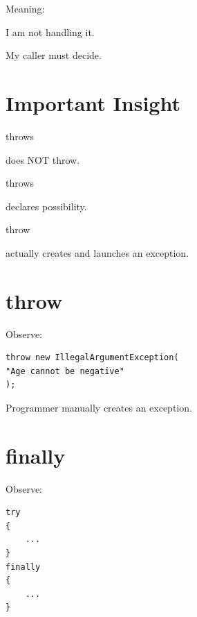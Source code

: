 \documentclass[11pt,a4paper]{book}
\begin{document}

Meaning:


I am not handling it.


My caller must decide.


\section{Important Insight}

throws

does NOT throw.


throws

declares possibility.


throw

actually creates and launches
an exception.


\section{throw}

Observe:

\begin{verbatim} 
throw new IllegalArgumentException(
"Age cannot be negative"
);
\end{verbatim}


Programmer manually creates
an exception.


\section{finally}

Observe:

\begin{verbatim} 
try
{
    ...
}
finally
{
    ...
}
\end{verbatim}
\end{document}
